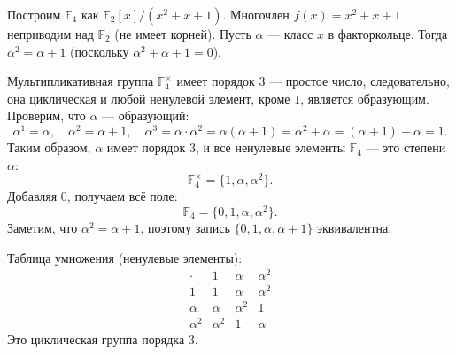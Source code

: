 \documentclass[10pt]{article}
\begin{document}
\begin{example}
Построим $\mathbb{F}_4$ как $\mathbb{F}_2[x]/(x^2+x+1)$. Многочлен $f(x)=x^2+x+1$ неприводим над $\mathbb{F}_2$ (не имеет корней). Пусть $\alpha$ — класс $x$ в факторкольце. Тогда $\alpha^2 = \alpha+1$ (поскольку $\alpha^2+\alpha+1=0$).

Мультипликативная группа $\mathbb{F}_4^{\times}$ имеет порядок $3$ — простое число, следовательно, она циклическая и любой ненулевой элемент, кроме $1$, является образующим. Проверим, что $\alpha$ — образующий:
\[
\alpha^1 = \alpha,\quad \alpha^2 = \alpha+1,\quad \alpha^3 = \alpha \cdot \alpha^2 = \alpha(\alpha+1) = \alpha^2+\alpha = (\alpha+1)+\alpha = 1.
\]
Таким образом, $\alpha$ имеет порядок $3$, и все ненулевые элементы $\mathbb{F}_4$ — это степени $\alpha$:
\[
\mathbb{F}_4^{\times} = \{1, \alpha, \alpha^2\}.
\]
Добавляя $0$, получаем всё поле:
\[
\mathbb{F}_4 = \{0, 1, \alpha, \alpha^2\}.
\]
Заметим, что $\alpha^2 = \alpha+1$, поэтому запись $\{0,1,\alpha,\alpha+1\}$ эквивалентна.

Таблица умножения (ненулевые элементы):
\[
\begin{array}{c|ccc}
\cdot & 1 & \alpha & \alpha^2 \\ \hline
1 & 1 & \alpha & \alpha^2 \\
\alpha & \alpha & \alpha^2 & 1 \\
\alpha^2 & \alpha^2 & 1 & \alpha
\end{array}
\]
Это циклическая группа порядка $3$.
\end{example}
\end{document}
